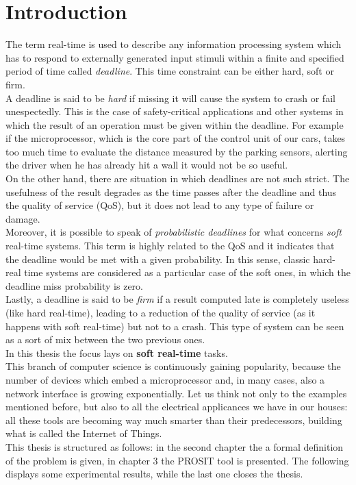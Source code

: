 \chapter{Introduction}\label{chp:introduction}


The term real-time is used to describe any information processing system which has to respond to externally generated input stimuli within a finite and specified period of time called \emph{deadline}.
This time constraint can be either hard, soft or firm.\\
A deadline is said to be \emph{hard} if missing it will cause the system to crash or fail unespectedly. This is the case of safety-critical applications and other systems in which the result of an operation must be given within the deadline. For example if the microprocessor, which is the core part of the control unit of our cars, takes too much time to evaluate the distance measured by the parking sensors, alerting the driver when he has already hit a wall it would not be so useful.\\
On the other hand, there are situation in which deadlines are not such strict. The usefulness of the result degrades as the time passes after the deadline and thus the quality of service (QoS), but it does not lead to any type of failure or damage.\\
Moreover, it is possible to speak of \emph{probabilistic deadlines} for what concerns \emph{soft} real-time systems. This term is highly related to the QoS and it indicates that the deadline would be met with a given probability. In this sense, classic hard-real time systems are considered as a particular case of the soft ones, in which the deadline miss probability is zero.\\ 
Lastly, a deadline is said to be \emph{firm} if a result computed late is completely useless (like hard real-time), leading to a reduction of the quality of service (as it happens with soft real-time) but not to a crash. This type of system can be seen as a sort of mix between the two previous ones.\\
In this thesis the focus lays on \textbf{soft real-time} tasks.\\
This branch of computer science is continuously gaining popularity, because the number of devices which embed a microprocessor and, in many cases, also a network interface is growing exponentially. Let us think not only to the examples mentioned before, but also to all the electrical applicances we have in our houses: all these tools are becoming way much smarter than their predecessors, building what is called the Internet of Things.\\
This thesis is structured as follows: in the second chapter the a formal definition of the problem is given, in chapter 3 the PROSIT tool is presented. The following displays some experimental results, while the last one closes the thesis.      